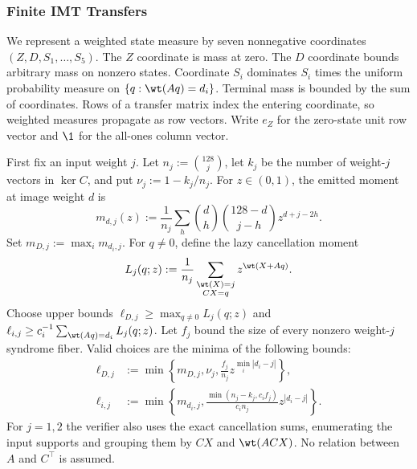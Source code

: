 \subsubsection{Finite IMT Transfers}
\label{app:imt-finite-transfers}

We represent a weighted state measure by seven nonnegative coordinates
$(Z,D,S_1,\ldots,S_5)$. The $Z$ coordinate is mass at zero. The $D$
coordinate bounds arbitrary mass on nonzero states. Coordinate $S_i$
dominates $S_i$ times the uniform probability measure on
$\{q:\wt(Aq)=d_i\}$. Terminal mass is bounded by the sum of coordinates.
Rows of a transfer matrix index the entering coordinate, so weighted
measures propagate as row vectors. Write $e_Z$ for the zero-state unit row
vector and $\1$ for the all-ones column vector.

First fix an input weight $j$. Let $n_j:=\binom{128}{j}$, let $k_j$ be the
number of weight-$j$ vectors in $\ker C$, and put $\nu_j:=1-k_j/n_j$.
For $z\in(0,1)$, the emitted moment at image weight $d$ is
\[
 m_{d,j}(z):=\frac1{n_j}\sum_h
 \binom dh\binom{128-d}{j-h}z^{d+j-2h}.
\]
Set $m_{D,j}:=\max_i m_{d_i,j}$. For $q\ne0$, define the lazy
cancellation moment
\[
 L_j(q;z):=\frac1{n_j}\sum_{\substack{\wt(X)=j\\CX=q}}
 z^{\wt(X+Aq)}.
\]
Choose upper bounds $\ell_{D,j}\ge\max_{q\ne0}L_j(q;z)$ and
$\ell_{i,j}\ge c_i^{-1}\sum_{\wt(Aq)=d_i}L_j(q;z)$.
Let $f_j$ bound the size of every nonzero weight-$j$ syndrome fiber. Valid
choices are the minima of the following bounds:
\begin{align*}
 \ell_{D,j}&:=
 \min\left\{m_{D,j},\nu_j,
 \frac{f_j}{n_j}z^{\min_i|d_i-j|}\right\},\\
 \ell_{i,j}&:=
 \min\left\{m_{d_i,j},
 \frac{\min(n_j-k_j,c_i f_j)}{c_i n_j}z^{|d_i-j|}\right\}.
\end{align*}
For $j=1,2$ the verifier also uses the exact cancellation sums, enumerating
the input supports and grouping them by $CX$ and $\wt(ACX)$. No relation
between $A$ and $C^\top$ is assumed.

